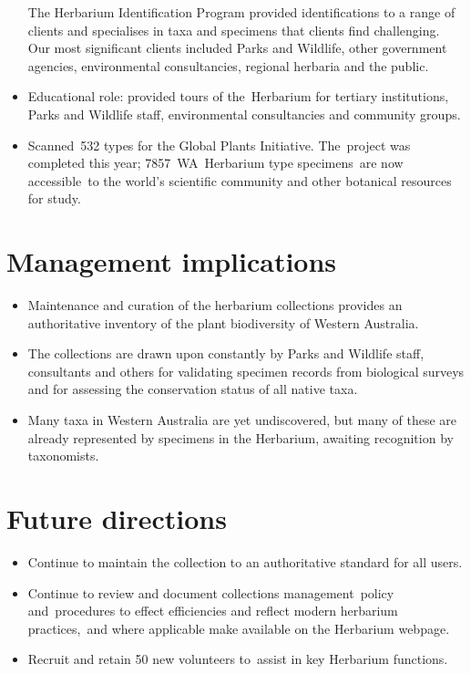 \documentclass[version=last,
    paper=a4, %
    10pt, %
    usenames,
    dvipsnames,
    oneside, %
    headings=openany, %
    DIV=15 %
]{scrbook}
\begin{document}
\begin{itemize}
  The Herbarium Identification Program provided identifications to a
  range of clients and specialises in taxa and specimens that clients
  find challenging. Our most significant clients included Parks and
  Wildlife, other government agencies, environmental consultancies,
  regional herbaria and the public.
\item
  Educational role: provided tours of the~Herbarium for tertiary
  institutions, Parks and Wildlife staff, environmental consultancies
  and community groups.
\item
  Scanned~532 types for the Global Plants Initiative. The~project was
  completed this year; 7857~WA~Herbarium type specimens~are now
  accessible~to the world's scientific community and other botanical
  resources for study.
\end{itemize}




\section*{Management implications}

\begin{itemize}
\itemsep1pt\parskip0pt
\item
  Maintenance and curation of the herbarium collections provides an
  authoritative inventory of the plant biodiversity of Western
  Australia.
\item
  The collections are drawn upon constantly by Parks and Wildlife staff,
  consultants and others for validating specimen records from biological
  surveys and for assessing the conservation status of all native taxa.
\item
  Many taxa in Western Australia are yet undiscovered, but many of these
  are already represented by specimens in the Herbarium, awaiting
  recognition by taxonomists.
\end{itemize}




\section*{Future directions}

\begin{itemize}
\itemsep1pt\parskip0pt
\item
  Continue to maintain the collection to an authoritative standard for
  all users.
\item
  Continue to review and document collections management~policy
  and~procedures to effect efficiencies and reflect modern herbarium
  practices,~and where applicable make available on the Herbarium
  webpage.
\item
  Recruit and retain 50 new volunteers to~assist in key Herbarium
  functions.
\end{itemize}



\end{document}
